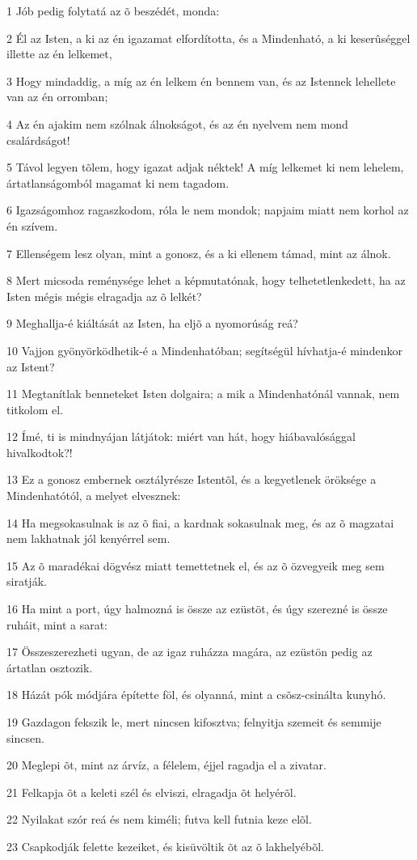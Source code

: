 \par 1 Jób pedig folytatá az õ beszédét, monda:
\par 2 Él az Isten, a ki az én igazamat elfordította, és a Mindenható, a ki keserûséggel illette az én lelkemet,
\par 3 Hogy mindaddig, a míg az én lelkem én bennem van, és az Istennek lehellete van az én orromban;
\par 4 Az én ajakim nem szólnak álnokságot, és az én nyelvem nem mond csalárdságot!
\par 5 Távol legyen tõlem, hogy igazat adjak néktek! A míg lelkemet ki nem lehelem, ártatlanságomból magamat ki nem tagadom.
\par 6 Igazságomhoz ragaszkodom, róla le nem mondok; napjaim miatt nem korhol az én szívem.
\par 7 Ellenségem lesz olyan, mint a gonosz, és a ki ellenem támad, mint az álnok.
\par 8 Mert micsoda reménysége lehet a képmutatónak, hogy telhetetlenkedett, ha az Isten mégis mégis elragadja az õ lelkét?
\par 9 Meghallja-é kiáltását az Isten, ha eljõ a nyomorúság reá?
\par 10 Vajjon gyönyörködhetik-é a Mindenhatóban; segítségül hívhatja-é mindenkor az Istent?
\par 11 Megtanítlak benneteket Isten dolgaira; a mik a Mindenhatónál vannak, nem titkolom el.
\par 12 Ímé, ti is mindnyájan látjátok: miért van hát, hogy hiábavalósággal hivalkodtok?!
\par 13 Ez a gonosz embernek osztályrésze Istentõl, és a kegyetlenek öröksége a Mindenhatótól, a melyet elvesznek:
\par 14 Ha megsokasulnak is az õ fiai, a kardnak sokasulnak meg, és az õ magzatai nem lakhatnak jól kenyérrel sem.
\par 15 Az õ maradékai dögvész miatt temettetnek el, és az õ özvegyeik meg sem siratják.
\par 16 Ha mint a port, úgy halmozná is össze az ezüstöt, és úgy szerezné is össze ruháit, mint a sarat:
\par 17 Összeszerezheti ugyan, de az igaz ruházza magára, az ezüstön pedig az ártatlan osztozik.
\par 18 Házát pók módjára építette föl, és olyanná, mint a csõsz-csinálta kunyhó.
\par 19 Gazdagon fekszik le, mert nincsen kifosztva; felnyitja szemeit és semmije sincsen.
\par 20 Meglepi õt, mint az árvíz, a félelem, éjjel ragadja el a zivatar.
\par 21 Felkapja õt a keleti szél és elviszi, elragadja õt helyérõl.
\par 22 Nyilakat szór reá és nem kiméli; futva kell futnia keze elõl.
\par 23 Csapkodják felette kezeiket, és kisüvöltik õt az õ lakhelyébõl.

